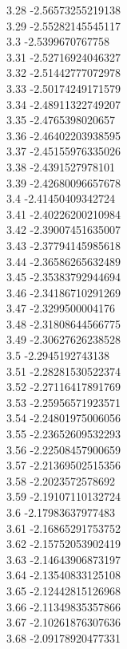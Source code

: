 {3.28	-2.56573255219138\\
3.29	-2.55282145545117\\
3.3	-2.5399670767758\\
3.31	-2.52716924046327\\
3.32	-2.51442777072978\\
3.33	-2.50174249171579\\
3.34	-2.48911322749207\\
3.35	-2.4765398020657\\
3.36	-2.46402203938595\\
3.37	-2.45155976335026\\
3.38	-2.4391527978101\\
3.39	-2.42680096657678\\
3.4	-2.41450409342724\\
3.41	-2.40226200210984\\
3.42	-2.39007451635007\\
3.43	-2.37794145985618\\
3.44	-2.36586265632489\\
3.45	-2.35383792944694\\
3.46	-2.34186710291269\\
3.47	-2.3299500004176\\
3.48	-2.31808644566775\\
3.49	-2.30627626238528\\
3.5	-2.2945192743138\\
3.51	-2.28281530522374\\
3.52	-2.27116417891769\\
3.53	-2.25956571923571\\
3.54	-2.24801975006056\\
3.55	-2.23652609532293\\
3.56	-2.22508457900659\\
3.57	-2.21369502515356\\
3.58	-2.2023572578692\\
3.59	-2.19107110132724\\
3.6	-2.17983637977483\\
3.61	-2.16865291753752\\
3.62	-2.15752053902419\\
3.63	-2.14643906873197\\
3.64	-2.13540833125108\\
3.65	-2.12442815126968\\
3.66	-2.11349835357866\\
3.67	-2.10261876307636\\
3.68	-2.09178920477331\\
}
